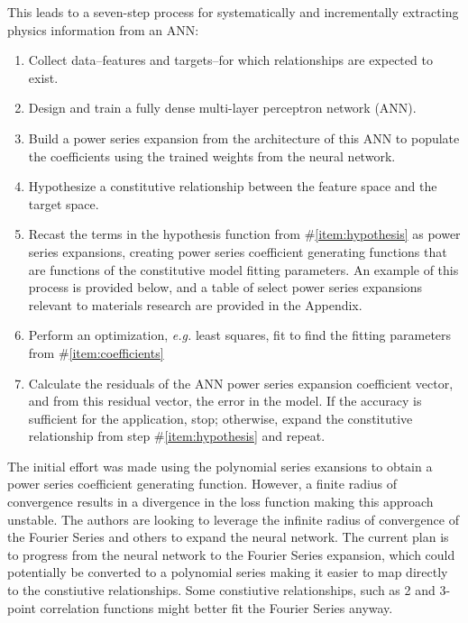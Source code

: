 This leads to a seven-step process for systematically and incrementally extracting physics information from an ANN:
\begin{enumerate}
	\item Collect data--features and targets--for which relationships are expected to exist.
	\item Design and train a fully dense multi-layer perceptron network (ANN).
	\item Build a power series expansion from the architecture of this ANN to populate the coefficients using the trained weights from the neural network.
	\item Hypothesize a constitutive relationship between the feature space and the target space. \label{item:hypothesis}
	\item Recast the terms in the hypothesis function from \#\ref{item:hypothesis} as power series expansions, creating power series coefficient generating functions that are functions of the constitutive model fitting parameters. An example of this process is provided below, and a table of select power series expansions relevant to materials research are provided in the Appendix.
	\item Perform an optimization, \emph{e.g.} least squares, fit to find the fitting parameters from \#\ref{item:coefficients}
	\item Calculate the residuals of the ANN power series expansion coefficient vector, and from this residual vector, the error in the model. If the accuracy is sufficient for the application, stop; otherwise, expand the constitutive relationship from step \#\ref{item:hypothesis} and repeat.
\end{enumerate}

The initial effort was made using the polynomial series exansions to obtain a power series coefficient generating function. However, a finite radius of convergence results in a divergence in the loss function making this approach unstable. The authors are looking to leverage the infinite radius of convergence of the Fourier Series and others to expand the neural network. The current plan is to progress from the neural network to the Fourier Series expansion, which could potentially be converted to a polynomial series making it easier to map directly to the constiutive relationships. Some constiutive relationships, such as 2 and 3-point correlation functions might better fit the Fourier Series anyway. 